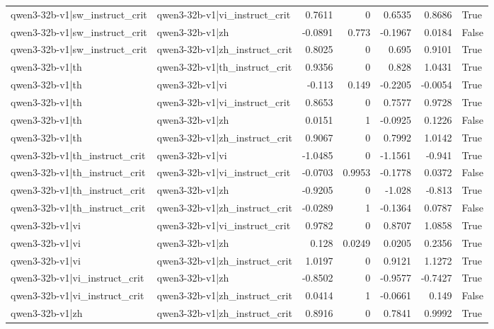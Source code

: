 \begin{table}
\begin{tabular}{l l r r r r l}
qwen3-32b-v1|sw_instruct_crit & qwen3-32b-v1|vi_instruct_crit & 0.7611 & 0 & 0.6535 & 0.8686 & True \\
qwen3-32b-v1|sw_instruct_crit & qwen3-32b-v1|zh & -0.0891 & 0.773 & -0.1967 & 0.0184 & False \\
qwen3-32b-v1|sw_instruct_crit & qwen3-32b-v1|zh_instruct_crit & 0.8025 & 0 & 0.695 & 0.9101 & True \\
qwen3-32b-v1|th & qwen3-32b-v1|th_instruct_crit & 0.9356 & 0 & 0.828 & 1.0431 & True \\
qwen3-32b-v1|th & qwen3-32b-v1|vi & -0.113 & 0.149 & -0.2205 & -0.0054 & True \\
qwen3-32b-v1|th & qwen3-32b-v1|vi_instruct_crit & 0.8653 & 0 & 0.7577 & 0.9728 & True \\
qwen3-32b-v1|th & qwen3-32b-v1|zh & 0.0151 & 1 & -0.0925 & 0.1226 & False \\
qwen3-32b-v1|th & qwen3-32b-v1|zh_instruct_crit & 0.9067 & 0 & 0.7992 & 1.0142 & True \\
qwen3-32b-v1|th_instruct_crit & qwen3-32b-v1|vi & -1.0485 & 0 & -1.1561 & -0.941 & True \\
qwen3-32b-v1|th_instruct_crit & qwen3-32b-v1|vi_instruct_crit & -0.0703 & 0.9953 & -0.1778 & 0.0372 & False \\
qwen3-32b-v1|th_instruct_crit & qwen3-32b-v1|zh & -0.9205 & 0 & -1.028 & -0.813 & True \\
qwen3-32b-v1|th_instruct_crit & qwen3-32b-v1|zh_instruct_crit & -0.0289 & 1 & -0.1364 & 0.0787 & False \\
qwen3-32b-v1|vi & qwen3-32b-v1|vi_instruct_crit & 0.9782 & 0 & 0.8707 & 1.0858 & True \\
qwen3-32b-v1|vi & qwen3-32b-v1|zh & 0.128 & 0.0249 & 0.0205 & 0.2356 & True \\
qwen3-32b-v1|vi & qwen3-32b-v1|zh_instruct_crit & 1.0197 & 0 & 0.9121 & 1.1272 & True \\
qwen3-32b-v1|vi_instruct_crit & qwen3-32b-v1|zh & -0.8502 & 0 & -0.9577 & -0.7427 & True \\
qwen3-32b-v1|vi_instruct_crit & qwen3-32b-v1|zh_instruct_crit & 0.0414 & 1 & -0.0661 & 0.149 & False \\
qwen3-32b-v1|zh & qwen3-32b-v1|zh_instruct_crit & 0.8916 & 0 & 0.7841 & 0.9992 & True \\
\bottomrule
\end{tabular}
\end{table}
